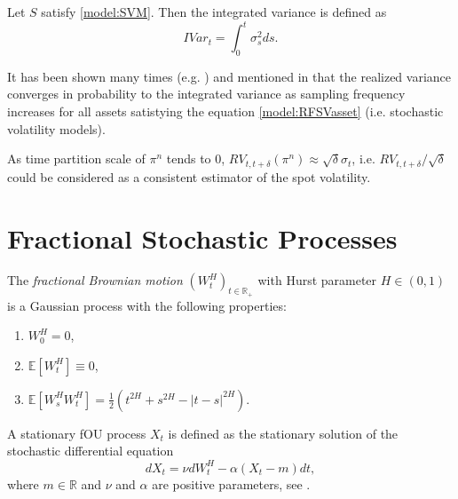     \begin{definition}
        Let $S$ satisfy \eqref{model:SVM}. Then the integrated variance is defined as
        \begin{equation}\label{def:IV}
            IVar_t = \int_{0}^{t} \sigma_s^2 ds.
        \end{equation}
    \end{definition}
    It has been shown many times (e.g. \cite{Barndorff-Nielsen2002}) and mentioned in \cite{Cont2022} that the realized variance converges 
    in probability to the integrated variance as sampling frequency increases for all assets satistying the equation 
    \eqref{model:RFSVasset} (i.e. stochastic volatility models).
    \begin{proposition} 
        As time partition scale of $\pi^n$ tends to $0$, $RV_{t, t + \delta}(\pi^n) \approx \sqrt{\delta} \sigma_t$, i.e. $RV_{t, t + \delta}/\sqrt{\delta}$ could be considered as a consistent estimator of the spot volatility.
    \end{proposition}

\section{Fractional Stochastic Processes}
    \begin{definition}
        The \emph{fractional Brownian motion} $(W_t^H)_{t\in \mathbb{R_+}}$ with Hurst 
        parameter $H \in (0, 1)$ is a Gaussian process with the following properties:
        \begin{enumerate}
            \item $W_0^H = 0$,
            \item $\mathbb{E}\left[W_t^H\right] \equiv 0$,
            \item $\mathbb{E}\left[W_s^H W_t^H\right] = \frac{1}{2} \left(t^{2H} + s^{2H} - |t-s|^{2H}\right)$.
        \end{enumerate}
    \end{definition}

    \begin{definition}
        A stationary fOU process $X_t$ is defined as the stationary solution of the stochastic differential equation
        \begin{equation}
            dX_t = \nu dW^H_t - \alpha (X_t - m)dt,
        \end{equation}
        where $m \in \mathbb{R}$ and $\nu$ and $\alpha$ are positive parameters, see \cite{Cheridito2003}.
    \end{definition}

